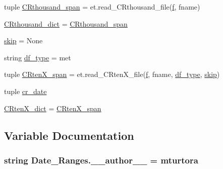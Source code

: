 \begin{DoxyCompactItemize}
\item 
tuple \hyperlink{namespace_date___ranges_ab7a9f3dbdd1532a99ec785cb471b70b7}{C\+Rthousand\+\_\+span} = et.\+read\+\_\+\+C\+Rthousand\+\_\+file(\hyperlink{namespace_date___ranges_afc7dea9c3c3f747aa8fb116c9272c535}{f}, fname)
\item 
\hyperlink{namespace_date___ranges_ab0958a6af22d624e05417468a7406ad3}{C\+Rthousand\+\_\+dict} = \hyperlink{namespace_date___ranges_ab7a9f3dbdd1532a99ec785cb471b70b7}{C\+Rthousand\+\_\+span}
\item 
\hyperlink{namespace_date___ranges_a2e24c9e69898dca66dbb055153bb007c}{skip} = None
\item 
string \hyperlink{namespace_date___ranges_a605d356940e408c8334d1e34c3a5c8e9}{df\+\_\+type} = \textquotesingle{}met\textquotesingle{}
\item 
tuple \hyperlink{namespace_date___ranges_a2aa7bd3a9fbf74e4eb8bb02ef545ee18}{C\+Rten\+X\+\_\+span} = et.\+read\+\_\+\+C\+Rten\+X\+\_\+file(\hyperlink{namespace_date___ranges_afc7dea9c3c3f747aa8fb116c9272c535}{f}, fname, \hyperlink{namespace_date___ranges_a605d356940e408c8334d1e34c3a5c8e9}{df\+\_\+type}, \hyperlink{namespace_date___ranges_a2e24c9e69898dca66dbb055153bb007c}{skip})
\item 
tuple \hyperlink{namespace_date___ranges_a0e1868e374f00a243815eb9757833c80}{cr\+\_\+date}
\item 
\hyperlink{namespace_date___ranges_a8d71b20b2d6f8a8bb8883a6f96a6cb7e}{C\+Rten\+X\+\_\+dict} = \hyperlink{namespace_date___ranges_a2aa7bd3a9fbf74e4eb8bb02ef545ee18}{C\+Rten\+X\+\_\+span}
\end{DoxyCompactItemize}


\subsection{Variable Documentation}
\hypertarget{namespace_date___ranges_a74443da5ab7e30b6f0df595d9193852e}{}
\subsubsection[{\+\_\+\+\_\+author\+\_\+\+\_\+}]{\setlength{\rightskip}{0pt plus 5cm}string Date\+\_\+\+Ranges.\+\_\+\+\_\+author\+\_\+\+\_\+ = \textquotesingle{}mturtora\textquotesingle{}}\label{namespace_date___ranges_a74443da5ab7e30b6f0df595d9193852e}


